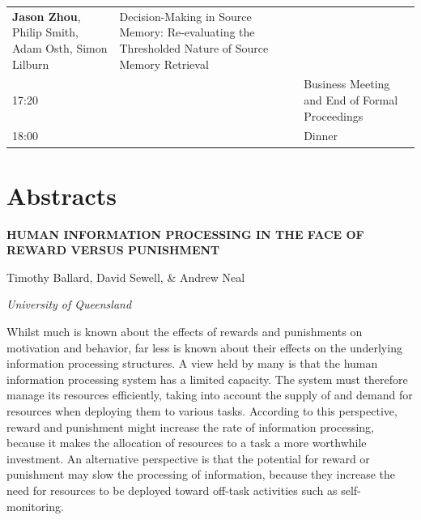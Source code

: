 \documentclass[]{article}
\begin{document}
\begin{longtable}[]{@{}lll@{}}
\begin{minipage}[t]{0.32\columnwidth}
\textbf{Jason Zhou}, Philip Smith, Adam Osth, Simon Lilburn\strut
\end{minipage} & \begin{minipage}[t]{0.57\columnwidth}\raggedright\strut
Decision-Making in Source Memory: Re-evaluating the Thresholded Nature
of Source Memory Retrieval\strut
\end{minipage}\tabularnewline
\begin{minipage}[t]{0.03\columnwidth}\raggedright\strut
17:20\strut
\end{minipage} & \begin{minipage}[t]{0.32\columnwidth}\raggedright\strut
\strut
\end{minipage} & \begin{minipage}[t]{0.57\columnwidth}\raggedright\strut
Business Meeting and End of Formal Proceedings\strut
\end{minipage}\tabularnewline
\begin{minipage}[t]{0.03\columnwidth}\raggedright\strut
18:00\strut
\end{minipage} & \begin{minipage}[t]{0.32\columnwidth}\raggedright\strut
\strut
\end{minipage} & \begin{minipage}[t]{0.57\columnwidth}\raggedright\strut
Dinner\strut
\end{minipage}\tabularnewline
\bottomrule
\end{longtable}

\newpage

\section{Abstracts}\label{abstracts}

\textbf{HUMAN INFORMATION PROCESSING IN THE FACE OF REWARD VERSUS
PUNISHMENT}

Timothy Ballard, David Sewell, \& Andrew Neal

\emph{University of Queensland}

Whilst much is known about the effects of rewards and punishments on
motivation and behavior, far less is known about their effects on the
underlying information processing structures. A view held by many is
that the human information processing system has a limited capacity. The
system must therefore manage its resources efficiently, taking into
account the supply of and demand for resources when deploying them to
various tasks. According to this perspective, reward and punishment
might increase the rate of information processing, because it makes the
allocation of resources to a task a more worthwhile investment. An
alternative perspective is that the potential for reward or punishment
may slow the processing of information, because they increase the need
for resources to be deployed toward off-task activities such as
self-monitoring.
\end{document}
